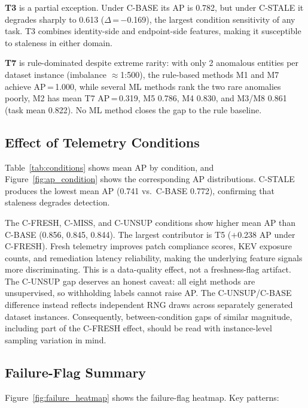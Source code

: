 \textbf{T3} is a partial exception. Under C-BASE its AP is 0.782, but under
C-STALE it degrades sharply to 0.613 ($\Delta$\,=\,$-$0.169), the largest
condition sensitivity of any task. T3 combines identity-side and endpoint-side
features, making it susceptible to staleness in either domain.

\textbf{T7} is rule-dominated despite extreme rarity: with only 2 anomalous
entities per dataset instance (imbalance $\approx$1:500), the rule-based methods
M1 and M7 achieve AP\,=\,1.000, while several ML methods rank the two rare
anomalies poorly, M2 has mean T7 AP\,=\,0.319, M5 0.786, M4 0.830, and M3/M8
0.861 (task mean 0.822). No ML method closes the gap to the rule baseline.



\subsection{Effect of Telemetry Conditions}

Table~\ref{tab:conditions} shows mean AP by condition, and
Figure~\ref{fig:ap_condition} shows the corresponding AP distributions. C-STALE
produces the lowest mean AP (0.741 vs.\ C-BASE 0.772), confirming that staleness
degrades detection.

The C-FRESH, C-MISS, and C-UNSUP conditions show higher mean AP than C-BASE (0.856,
0.845, 0.844). The largest contributor is T5 ($+$0.238 AP under C-FRESH). Fresh
telemetry improves patch compliance scores, KEV exposure counts, and remediation
latency reliability, making the underlying feature signals more discriminating. This
is a data-quality effect, not a freshness-flag artifact.
The C-UNSUP gap deserves an honest caveat: all eight methods are unsupervised, so
withholding labels cannot raise AP. The C-UNSUP/C-BASE difference instead reflects
independent RNG draws across separately generated dataset instances. Consequently,
between-condition gaps of similar magnitude, including part of the C-FRESH
effect, should be read with instance-level sampling variation in mind.



\subsection{Failure-Flag Summary}

Figure~\ref{fig:failure_heatmap} shows the failure-flag heatmap. Key patterns:

